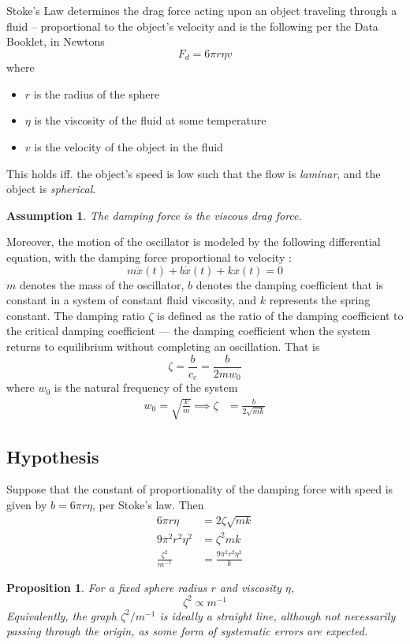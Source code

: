 \documentclass[a4paper,12pt]{article}
\newtheorem{proposition}{Proposition}
\newtheorem{assumption}{Assumption}
\begin{document}
Stoke's Law determines the drag force acting upon an object traveling through a fluid -- proportional to the object's velocity and is the following per the Data Booklet, in Newtons
$$F_d = 6\pi r \eta v $$ where
\begin{itemize}
  \item $r$ is the radius of the sphere
  \item $\eta$ is the viscosity of the fluid at some temperature
  \item $v$ is the velocity of the object in the fluid
\end{itemize}
This holds iff. the object's speed is low such that the flow is \textit{laminar}, and the object is \textit{spherical}.

\begin{assumption}
  \label{as:1}
  The damping force is the viscous drag force.
\end{assumption}

Moreover, the motion of the oscillator is modeled by the following differential equation, with the damping force proportional to velocity \parencite{miller_2004_13}:
\begin{equation}
  \label{eq:1}
  m\ddot{x}(t) + b\dot{x}(t) + kx(t) = 0
\end{equation}
$m$ denotes the mass of the oscillator, $b$ denotes the damping coefficient that is constant in a system of constant fluid viscosity, and $k$ represents the spring constant. The damping ratio $\zeta$ is defined as the ratio of the damping coefficient to the critical damping coefficient --- the damping coefficient when the system returns to equilibrium without completing an oscillation. That is $$\zeta = \frac{b}{c_c} = \frac{b}{2mw_0}$$
where $w_0$ is the natural frequency of the system
\begin{align*}
  w_0            = \sqrt{\frac{k}{m}}\implies \zeta & = \frac{b}{2\sqrt{mk}}
\end{align*}

\subsection{Hypothesis}

Suppose that the constant of proportionality of the damping force with speed is given by $b = 6\pi r \eta$, per Stoke's law. Then
\begin{align*}
  6\pi r \eta            & = 2\zeta \sqrt{mk}            \\
  9\pi^2 r^2 \eta^2      & = \zeta^2mk                   \\
  \frac{\zeta^2}{m^{-1}} & = \frac{9\pi^2 r^2 \eta^2}{k}
\end{align*}
\begin{proposition}
  For a fixed sphere radius $r$ and viscosity $\eta$, \begin{equation}
    \zeta^2 \propto m^{-1}
  \end{equation}
  Equivalently, the graph $\zeta^2/m^{-1}$ is ideally a straight line, although not necessarily passing through the origin, as some form of systematic errors are expected.
  \label{prop:1}
\end{proposition}
\end{document}

